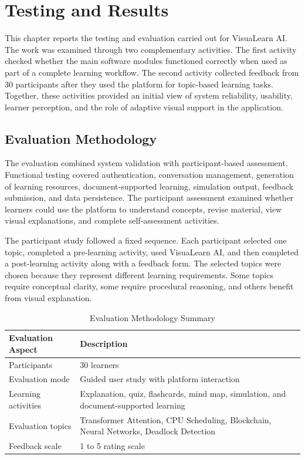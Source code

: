 \chapter{Testing and Results}

This chapter reports the testing and evaluation carried out for VisuaLearn AI. The work was examined through two complementary activities. The first activity checked whether the main software modules functioned correctly when used as part of a complete learning workflow. The second activity collected feedback from 30 participants after they used the platform for topic-based learning tasks. Together, these activities provided an initial view of system reliability, usability, learner perception, and the role of adaptive visual support in the application.

\section[Evaluation Methodology]{\textbf{Evaluation Methodology}}
The evaluation combined system validation with participant-based assessment. Functional testing covered authentication, conversation management, generation of learning resources, document-supported learning, simulation output, feedback submission, and data persistence. The participant assessment examined whether learners could use the platform to understand concepts, revise material, view visual explanations, and complete self-assessment activities.

The participant study followed a fixed sequence. Each participant selected one topic, completed a pre-learning activity, used VisuaLearn AI, and then completed a post-learning activity along with a feedback form. The selected topics were chosen because they represent different learning requirements. Some topics require conceptual clarity, some require procedural reasoning, and others benefit from visual explanation.

\begin{table}[H]
\centering
\caption{Evaluation Methodology Summary}
\begin{tabular}{p{5.4cm}p{6.2cm}}
\toprule
\textbf{Evaluation Aspect} & \textbf{Description}\\
\midrule
Participants & 30 learners\\
Evaluation mode & Guided user study with platform interaction\\
Learning activities & Explanation, quiz, flashcards, mind map, simulation, and document-supported learning\\
Evaluation topics & Transformer Attention, CPU Scheduling, Blockchain, Neural Networks, Deadlock Detection\\
Feedback scale & 1 to 5 rating scale\\
\bottomrule
\end{tabular}
\end{table}

